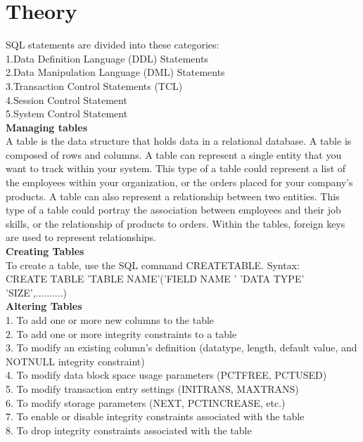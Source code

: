 \documentclass[13pt,oneside]{book}
\begin{document}
\section*{Theory}
SQL statements are divided into these categories:\\
1.Data Definition Language (DDL) Statements\\
2.Data Manipulation Language (DML) Statements\\
3.Transaction Control Statements (TCL)\\
4.Session Control Statement\\
5.System Control Statement\\
\textbf{Managing tables}\\
A table is the data structure that holds data in a relational database. A table is
composed of rows and columns.
A table can represent a single entity that you want to track within your system.
This type of a table could represent a list of the employees within your organization,
or the orders placed for your company’s products.
A table can also represent a relationship between two entities. This type of a
table could portray the association between employees and their job skills, or the
relationship of products to orders. Within the tables, foreign keys are used to represent
relationships.\\
\textbf{Creating Tables}\\
To create a table, use the SQL command CREATETABLE.
Syntax:\\
CREATE TABLE ’TABLE NAME’(’FIELD NAME ’ ’DATA TYPE’ ’SIZE’,..........)\\
\textbf{Altering Tables}\\
1. To add one or more new columns to the table\\
2. To add one or more integrity constraints to a table\\
3. To modify an existing column’s definition (datatype, length, default value, and
NOTNULL integrity constraint)\\
4. To modify data block space usage parameters (PCTFREE, PCTUSED)\\
5. To modify transaction entry settings (INITRANS, MAXTRANS)\\
6. To modify storage parameters (NEXT, PCTINCREASE, etc.)\\
7. To enable or disable integrity constraints associated with the table\\
8. To drop integrity constraints associated with the table
\end{document}
